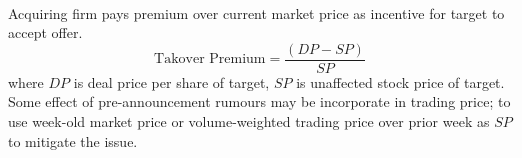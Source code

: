 \begin{method} \\
Acquiring firm pays premium over current market price as incentive for target to accept offer.
\begin{equation}
\text{Takover Premium} = \frac{(DP - SP)}{SP} \nonumber
\end{equation}
where $DP$ is deal price per share of target, $SP$ is unaffected stock price of target.\\
Some effect of pre-announcement rumours may be incorporate in trading price; to use week-old market price or volume-weighted trading price over prior week as $SP$ to mitigate the issue.
\end{method}
